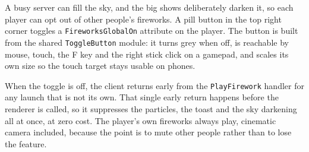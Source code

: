 \documentclass[12pt,letterpaper]{article}
\begin{document}
A busy server can fill the sky, and the big shows deliberately darken it, so each player can opt out of other people's fireworks. A pill button in the top right corner toggles a \texttt{FireworksGlobalOn} attribute on the player. The button is built from the shared \texttt{ToggleButton} module: it turns grey when off, is reachable by mouse, touch, the F key and the right stick click on a gamepad, and scales its own size so the touch target stays usable on phones.

When the toggle is off, the client returns early from the \texttt{PlayFirework} handler for any launch that is not its own. That single early return happens before the renderer is called, so it suppresses the particles, the toast and the sky darkening all at once, at zero cost. The player's own fireworks always play, cinematic camera included, because the point is to mute other people rather than to lose the feature.
\end{document}
